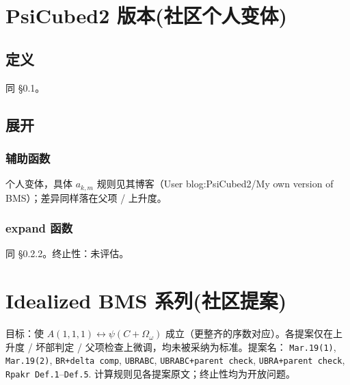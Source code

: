 \documentclass[UTF8]{ctexart}
\begin{document}
\section{PsiCubed2 版本(社区个人变体)}
\subsection{定义}
同 \S 0.1。

\subsection{展开}
\subsubsection{辅助函数}
个人变体，具体 $a_{k,m}$ 规则见其博客（User blog:PsiCubed2/My own version of BMS）；差异同样落在父项 / 上升度。

\subsubsection{expand 函数}
同 \S 0.2.2。终止性：未评估。

\section{Idealized BMS 系列(社区提案)}
目标：使 $A(1,1,1)\leftrightarrow\psi(C+\Omega_\omega)$ 成立（更整齐的序数对应）。各提案仅在上升度 / 坏部判定 / 父项检查上微调，均未被采纳为标准。提案名：
\texttt{Mar.19(1)}, \texttt{Mar.19(2)}, \texttt{BR+delta comp}, \texttt{UBRABC}, \texttt{UBRABC+parent check}, \texttt{UBRA+parent check}, \texttt{Rpakr Def.1}--\texttt{Def.5}.
计算规则见各提案原文；终止性均为开放问题。
\end{document}
